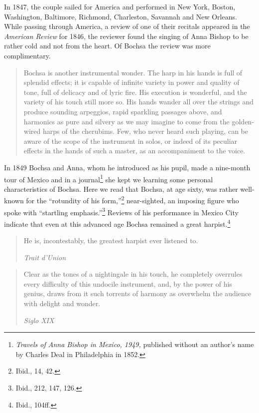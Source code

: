 \documentclass[a4paper, oneside, 12pt]{memoir}
\begin{document}
In 1847, the couple sailed for America and performed in New York, Boston, Washington, Baltimore, Richmond, Charleston, Savannah and New Orleans. While passing through America, a review of one of their recitals appeared in the \textit{American Review} for 1846, the reviewer found the singing of Anna Bishop to be rather cold and not from the heart. Of Bochsa the review was more complimentary.
\begin{quotation}
  Bochsa is another instrumental wonder. The harp in his hands is full of splendid effects; it is capable of infinite variety in power and quality of tone, full of delicacy and of lyric fire. His execution is wonderful, and the variety of his touch still more so. His hands wander all over the strings and produce sounding arpeggios, rapid sparkling passages above, and harmonics as pure and silvery as we may imagine to come from the golden-wired harps of the cherubims. Few, who never heard such playing, can be aware of the scope of the instrument in solos, or indeed of its peculiar effects in the hands of such a master, as an accompaniment to the voice.
\end{quotation}

\clearpage

In 1849 Bochsa and Anna, whom he introduced as his pupil, made a nine-month tour of Mexico and in a journal\footnote{\textit{Travels of Anna Bishop in Mexico, 1949,} published without an author's name by Charles Deal in Philadelphia in 1852.} she kept we learning some personal characteristics of Bochsa. Here we read that Bochsa, at age sixty, was rather well-known for the ``rotundity of his form,''\footnote{Ibid., 14, 42.} near-sighted, an imposing figure who spoke with ``startling emphasis.''\footnote{Ibid., 212, 147, 126.} Reviews of his performance in Mexico City indicate that even at this advanced age Bochsa remained a great harpist.\footnote{Ibid., 104ff.}

\begin{quotation}
  He is, incontestably, the greatest harpist ever listened to.
  
\textit{Trait d'Union}
\end{quotation}


\begin{quotation}
  Clear as the tones of a nightingale in his touch, he completely overrules every difficulty of this undocile instrument, and, by the power of his genius, draws from it such torrents of harmony as overwhelm the audience with delight and wonder.
  
\textit{Siglo XIX}
\end{quotation}
\end{document}
